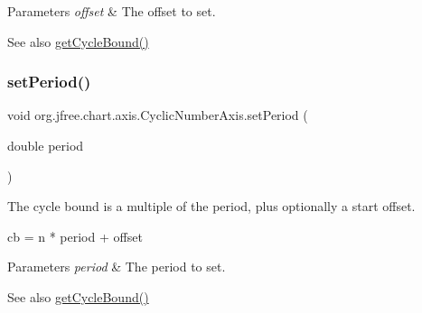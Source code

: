 \begin{DoxyParams}{Parameters}
{\em offset} & The offset to set.\\
\hline
\end{DoxyParams}
\begin{DoxySeeAlso}{See also}
\mbox{\hyperlink{classorg_1_1jfree_1_1chart_1_1axis_1_1_cyclic_number_axis_af988de5e084906aebb81e7f12599d827}{get\+Cycle\+Bound()}} 
\end{DoxySeeAlso}
\mbox{\label{classorg_1_1jfree_1_1chart_1_1axis_1_1_cyclic_number_axis_abe4d20b864e5abc7d32c952c74c8721f}} 
\subsubsection{\texorpdfstring{set\+Period()}{setPeriod()}}
{\footnotesize\ttfamily void org.\+jfree.\+chart.\+axis.\+Cyclic\+Number\+Axis.\+set\+Period (\begin{DoxyParamCaption}\item[{double}]{period }\end{DoxyParamCaption})}

The cycle bound is a multiple of the period, plus optionally a start offset. 
\begin{DoxyPre}cb = n * period + offset\end{DoxyPre}



\begin{DoxyParams}{Parameters}
{\em period} & The period to set.\\
\hline
\end{DoxyParams}
\begin{DoxySeeAlso}{See also}
\mbox{\hyperlink{classorg_1_1jfree_1_1chart_1_1axis_1_1_cyclic_number_axis_af988de5e084906aebb81e7f12599d827}{get\+Cycle\+Bound()}} 
\end{DoxySeeAlso}
\mbox{\label{classorg_1_1jfree_1_1chart_1_1axis_1_1_cyclic_number_axis_a8a4b79b1849b1208a4a1038fea1b4a4d}} 
